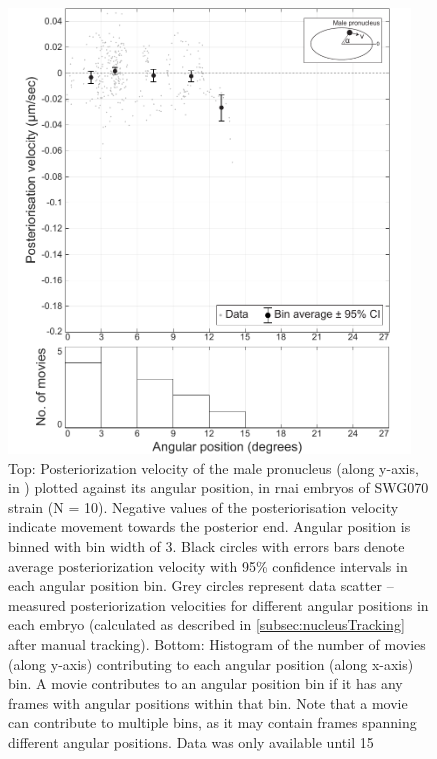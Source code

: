 \begin{figure}[p]
\centering
\includegraphics[width=0.95\textwidth]{Results/FigExpMlc4/mlc4PostVel.pdf}
\caption[Experimentally observed posteriorisation velocity of the male pronucleus in  \acs{rnai} embryos]{Top: Posteriorization velocity of the male pronucleus (along y-axis, in \si{\unitPostVel}) plotted against its angular position, in  \ac{rnai} embryos of SWG070 strain (N = 10). Negative values of the posteriorisation velocity indicate movement towards the posterior end. Angular position is binned with bin width of \SI{3}{\unitAngle}. Black circles with errors bars denote average posteriorization velocity with \num{95}\% confidence intervals in each angular position bin. Grey circles represent data scatter -- measured posteriorization velocities for different angular positions in each embryo (calculated as described in \autoref{subsec:nucleusTracking} after manual tracking). Bottom: Histogram of the number of movies (along y-axis) contributing to each angular position (along x-axis) bin. A movie contributes to an angular position bin if it has any frames with angular positions within that bin. Note that a movie can contribute to multiple bins, as it may contain frames spanning different angular positions. Data was only available until \SI{15}{\unitAngle}}
\label{fig:swg070Mlc4PostVelVsAngle}
\end{figure}

